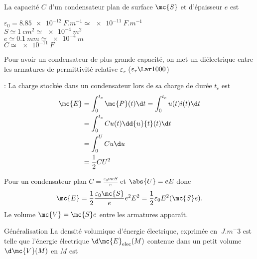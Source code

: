 \documentclass[12pt,fancy]{/Users/victor/Documents/COURS/2ACapECL/texmf/tex/latex/Preambles/cours}
\begin{document}
\begin{theorem}
La capacité $C$ d'un condensateur plan de surface $\mc{S}$ et d'épaisseur $e$ est 

\end{theorem}

\begin{odg}
$\varepsilon_{0} = \SI{8.85e-12}{F.m^{-1}} \simeq \SI{e-11}{F.m^{-1}}$ \\
$S \simeq \SI{1}{cm^2} \simeq \SI{e-4}{m^2}$\\
$e \simeq \SI{0.1}{mm} \simeq \SI{e-4}{m}$\\
$C \simeq \SI{e-11}{F}$

\end{odg}

\begin{remarque}
Pour avoir un condensateur de plus grande capacité, on met un diélectrique entre les armatures de permittivité relative $\varepsilon_{r}$ ($\varepsilon_{r} \Lar 1000$)
\end{remarque}

 : La charge stockée dans un condensateur lors de sa charge de durée $t_{c}$ est 
\begin{align*}
\mc{E} &= \int^{t_{c}}_{0} \mc{P}(t) \d t =  \int^{t_{c}}_{0} u(t) i(t) \d t \\
&=  \int^{t_{c}}_{0} C u(t) \dd{u}{t}(t) \d t \\
&= \int^{U}_{0} C u \d u\\
&= \frac{1}{2} C U^2
\end{align*}

\noindent Pour un condensateur plan $C = \frac{\varepsilon_{0} mc{S}}{e}$ et $\abs{U} = e E$ donc 
\begin{align*}
\mc{E} = \frac{1}{2} \frac{\varepsilon_{0} \mc{S}}{e} e^2 E^2 = \frac{1}{2} \varepsilon_{0} E^2 (\mc{S}e).
\end{align*}
Le volume $\mc{V} = \mc{S}e$ entre les armatures apparaît.

\begin{theorem}{Généralisation}
La densité volumique d'énergie électrique, exprimée en $\SI{}{J.m^-3}$ est 
telle que l'énergie électrique $\d \mc{E}_{\rm{elec}}(M)$ contenue dans un petit volume $\d \mc{V}(M)$ en $M$ est 
\end{theorem}
\end{document}
